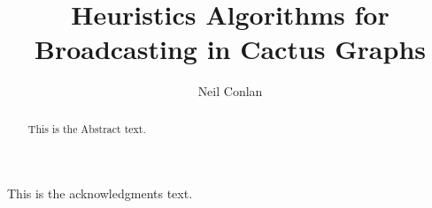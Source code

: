 
\author{Neil Conlan}
\title{Heuristics Algorithms for Broadcasting in Cactus Graphs}
\cosupervisor                   %




\begin{abstract}
	This is the Abstract text.
\end{abstract}

\begin{acknowledgments}
	This is the acknowledgments text.
\end{acknowledgments}





